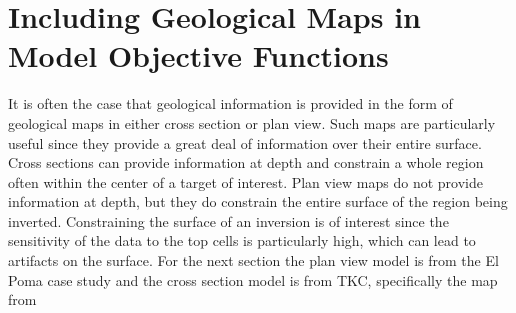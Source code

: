 
\chapter{Including Geological Maps in Model Objective Functions }
\label{ch:GIFtools}
%
%
%
%
%
%
%
%	
%
%
%

It is often the case that geological information is provided in the form of geological maps in either cross section or plan view. Such maps are particularly useful since they provide a great deal of information over their entire surface. Cross sections can provide information at depth and constrain a whole region often within the center of a target of interest. Plan view maps do not provide information at depth, but they do constrain the entire surface of the region being inverted.  Constraining the surface of an inversion is of interest since the sensitivity of the data to the top cells is particularly high, which can lead to artifacts on the surface. For the next section the plan view model is from the El Poma case study and the cross section model is from TKC, specifically the map from \citep{harder2006geology}


